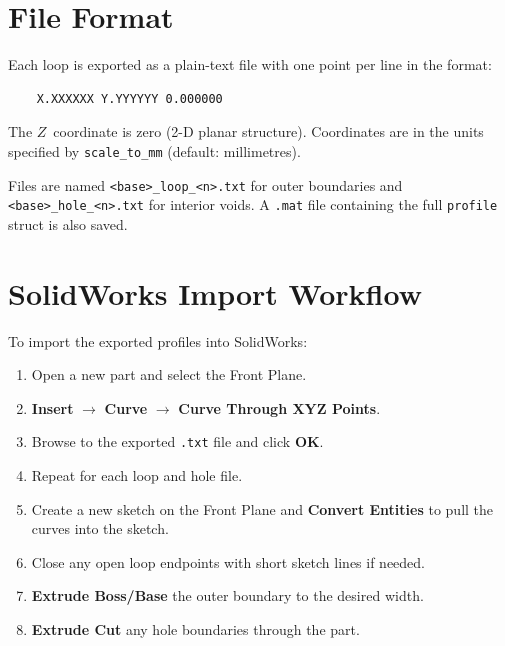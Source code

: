 \section{File Format}
\label{sec:export:format}

Each loop is exported as a plain-text file with one point per line in the
format:

\begin{verbatim}
    X.XXXXXX Y.YYYYYY 0.000000
\end{verbatim}

The $Z$~coordinate is zero (2-D planar structure).  Coordinates are in the
units specified by \texttt{scale\_to\_mm} (default: millimetres).

Files are named \texttt{<base>\_loop\_<n>.txt} for outer boundaries and
\texttt{<base>\_hole\_<n>.txt} for interior voids.  A \texttt{.mat} file
containing the full \texttt{profile} struct is also saved.

\section{SolidWorks Import Workflow}
\label{sec:export:solidworks}

To import the exported profiles into SolidWorks:

\begin{enumerate}
    \item Open a new part and select the Front Plane.
    \item \textbf{Insert} $\to$ \textbf{Curve} $\to$
          \textbf{Curve Through XYZ Points}.
    \item Browse to the exported \texttt{.txt} file and click \textbf{OK}.
    \item Repeat for each loop and hole file.
    \item Create a new sketch on the Front Plane and
          \textbf{Convert Entities} to pull the curves into the sketch.
    \item Close any open loop endpoints with short sketch lines if needed.
    \item \textbf{Extrude Boss/Base} the outer boundary to the desired width.
    \item \textbf{Extrude Cut} any hole boundaries through the part.
\end{enumerate}

